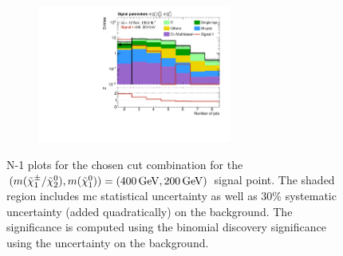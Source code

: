 \begin{figure}
\begin{subfigure}[b]{0.5\linewidth}
		\caption{}
	\end{subfigure}\hfill
	\begin{subfigure}[b]{0.5\linewidth}
		\centering\includegraphics[width=0.7\textwidth]{N-1_cut_scan/n1_400_200/nJet30}
		\caption{}
	\end{subfigure}

	\caption[N-1 plots for the chosen cut combination for the (400, 200) signal point]{N-1 plots for the chosen cut combination for the $(m(\charg/\neutr), m(\lsp)) = (\SI{400}{\GeV}, \SI{200}{\GeV})$ signal point. The shaded region includes \gls{mc} statistical uncertainty as well as 30\% systematic uncertainty (added quadratically) on the background. The significance is computed using the binomial discovery significance using the uncertainty on the background.}
	\label{fig:results_n1_400_200}
\end{figure}

